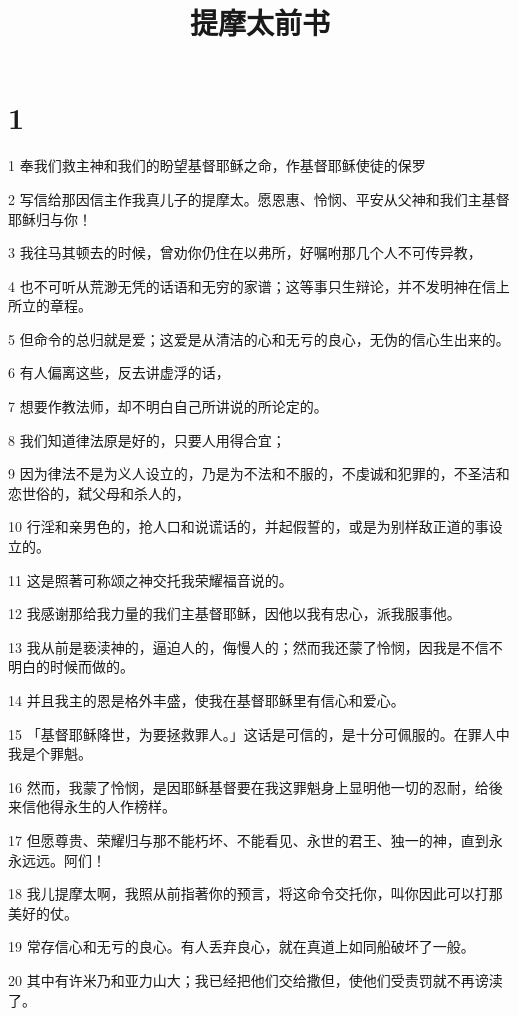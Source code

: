 

\title{提摩太前书}


\chapter{1}

\par 1 奉我们救主神和我们的盼望基督耶稣之命，作基督耶稣使徒的保罗
\par 2 写信给那因信主作我真儿子的提摩太。愿恩惠、怜悯、平安从父神和我们主基督耶稣归与你！
\par 3 我往马其顿去的时候，曾劝你仍住在以弗所，好嘱咐那几个人不可传异教，
\par 4 也不可听从荒渺无凭的话语和无穷的家谱；这等事只生辩论，并不发明神在信上所立的章程。
\par 5 但命令的总归就是爱；这爱是从清洁的心和无亏的良心，无伪的信心生出来的。
\par 6 有人偏离这些，反去讲虚浮的话，
\par 7 想要作教法师，却不明白自己所讲说的所论定的。
\par 8 我们知道律法原是好的，只要人用得合宜；
\par 9 因为律法不是为义人设立的，乃是为不法和不服的，不虔诚和犯罪的，不圣洁和恋世俗的，弑父母和杀人的，
\par 10 行淫和亲男色的，抢人口和说谎话的，并起假誓的，或是为别样敌正道的事设立的。
\par 11 这是照著可称颂之神交托我荣耀福音说的。
\par 12 我感谢那给我力量的我们主基督耶稣，因他以我有忠心，派我服事他。
\par 13 我从前是亵渎神的，逼迫人的，侮慢人的；然而我还蒙了怜悯，因我是不信不明白的时候而做的。
\par 14 并且我主的恩是格外丰盛，使我在基督耶稣里有信心和爱心。
\par 15 「基督耶稣降世，为要拯救罪人。」这话是可信的，是十分可佩服的。在罪人中我是个罪魁。
\par 16 然而，我蒙了怜悯，是因耶稣基督要在我这罪魁身上显明他一切的忍耐，给後来信他得永生的人作榜样。
\par 17 但愿尊贵、荣耀归与那不能朽坏、不能看见、永世的君王、独一的神，直到永永远远。阿们！
\par 18 我儿提摩太啊，我照从前指著你的预言，将这命令交托你，叫你因此可以打那美好的仗。
\par 19 常存信心和无亏的良心。有人丢弃良心，就在真道上如同船破坏了一般。
\par 20 其中有许米乃和亚力山大；我已经把他们交给撒但，使他们受责罚就不再谤渎了。

